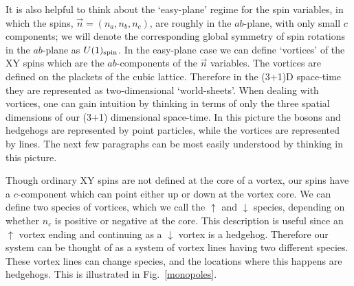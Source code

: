 \documentclass[prb,twocolumn]{revtex4-1}
\begin{document}
\begin{figure}
\label{heisbulk}
\end{figure}


It is also helpful to think about the `easy-plane' regime for the spin variables, in which the spins, $\vec{n} = (n_a, n_b, n_c)$, are roughly in the $ab$-plane, with only small $c$ components; we will denote the corresponding global symmetry of spin rotations in the $ab$-plane as $U(1)_{\rm spin}$. In the easy-plane case we can define `vortices' of the XY spins which are the $ab$-components of the $\vec n$ variables. The vortices are defined on the plackets of the cubic lattice. Therefore in the (3+1)D space-time they are represented as two-dimensional `world-sheets'. When dealing with vortices, one can gain intuition by thinking in terms of only the three spatial dimensions of our (3+1) dimensional space-time. In this picture the bosons and hedgehogs are represented by point particles, while the vortices are represented by lines. The next few paragraphs can be most easily understood by thinking in this picture.

Though ordinary XY spins are not defined at the core of a vortex, our spins have a $c$-component which can point either up or down at the vortex core. We can define two species of vortices, which we call the $\uparrow$ and $\downarrow$ species, depending on whether $n_c$ is positive or negative at the core. This description is useful since an $\uparrow$ vortex ending and continuing as a $\downarrow$ vortex is a hedgehog. Therefore our system can be thought of as a system of vortex lines having two different species. These vortex lines can change species, and the locations where this happens are hedgehogs.\cite{LesikSenthil} This is illustrated in Fig.~\ref{monopoles}.

\end{document}

